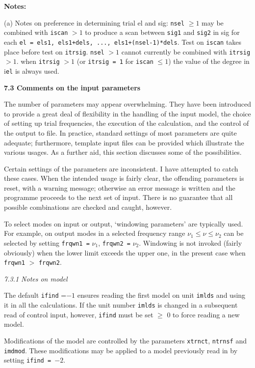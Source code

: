 \noindent
{\bf Notes:} 

\item{(a)} Notes on preference in determining trial el and sig:
\itemitem{--}
{\tt nsel} $\ge 1$ may be combined with {\tt iscan} $> 1$ to produce
a scan between {\tt sig1} and {\tt sig2} in sig for each
{\tt el = els1, els1+dels, ..., els1+(nsel-1)*dels}.
\itemitem{--}
Test on {\tt iscan} takes place before test on {\tt itrsig}.
\itemitem{--}
{\tt nsel} $> 1$ cannot currently be combined with {\tt itrsig} $> 1$.
when {\tt itrsig} $> 1$ (or {\tt itrsig = 1} for {\tt iscan} $\le 1$) the
value of the degree in i{\tt el} is always used.

\subsect
{\bf 7.3 Comments on the input parameters} 

The number of parameters may appear overwhelming.
They have been introduced to provide a great deal of flexibility in
the handling of the input model, the choice of setting up trial
frequencies, the execution of the calculation,
and the control of the output to file.
In practice, standard settings of most parameters are quite adequate;
furthermore, template input files can be provided which illustrate
the various usages.
As a further aid, this section discusses some of the possibilities.

Certain settings of the parameters are inconsistent.
I have attempted to catch these cases.
When the intended usage is fairly clear,
the offending parameters is reset, with a warning message;
otherwise an error message is written and the programme proceeds
to the next set of input.
There is no guarantee that all possible combinations are checked
and caught, however.

To select modes on input or output, `windowing parameters'
are typically used.
For example, on output modes in a selected frequency
range $\nu_1 \le \nu \le \nu_2$ can be selected by setting
{\tt frqwn1 =} $\nu_1$, {\tt frqwn2 =} $\nu_2$.
Windowing is not invoked (fairly obviously) when the lower limit 
exceeds the upper one, in the present case when
{\tt frqwn1} $>$ {\tt frqwn2}.

\subsect
{\it 7.3.1 Notes on model} 

The default {\tt ifind} =$ -1$ ensures reading the first model 
on unit {\tt imlds} and using it in all the calculations. 
If the unit number {\tt imlds} is changed in
a subsequent read of control input, however,
{\tt ifind} must be set $\ge$ 0 to force reading a new model.

Modifications of the model are controlled by the parameters
{\tt xtrnct}, {\tt ntrnsf} and {\tt imdmod}.
These modifications may be applied to a model previously
read in by setting {\tt ifind = $-2$}.

